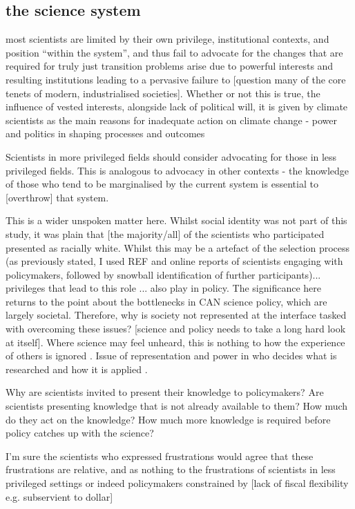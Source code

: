 \subsection{the science system}
\cite{Bendell2024} most scientists are limited by their own privilege, institutional contexts, and position ``within the system'', and thus fail to advocate for the changes that are required for truly just transition  
\cite{StoddardEtAl2021} problems arise due to powerful interests and resulting institutions leading to a pervasive failure to [question many of the core tenets of modern, industrialised societies]. Whether or not this is true, the influence of vested interests, alongside lack of political will, it is given by climate scientists as the main reasons for inadequate action on climate change \cite{Carrington2024} 
\cite{TurnhoutMWKL2020} - power and politics in shaping processes and outcomes

Scientists in more privileged fields should consider advocating for those in less privileged fields. This is analogous to advocacy in other contexts - the knowledge of those who tend to be marginalised by the current system is essential to [overthrow] that system.

This is a wider unspoken matter here. Whilst social identity was not part of this study, it was plain that [the majority/all] of the scientists who participated presented as racially white. Whilst this may be a artefact of the selection process (as previously stated, I used REF and online reports of scientists engaging with policymakers, followed by snowball identification of further participants)... privileges that lead to this role ... also play in policy. The significance here returns to the point about the bottlenecks in CAN science policy, which are largely societal. Therefore, why is society not represented at the interface tasked with overcoming these issues? [science and policy needs to take a long hard look at itself]. Where science may feel unheard, this is nothing to how the experience of others is ignored \cite{IbarraJOBCIMRS2022}. Issue of representation and power in who decides what is researched and how it is applied \cite{McNiePS2017}.

Why are scientists invited to present their knowledge to policymakers? Are scientists presenting knowledge that is not already available to them? How much do they act on the knowledge? How much more knowledge is required before policy catches up with the science?

I'm sure the scientists who expressed frustrations would agree that these frustrations are relative, and as nothing to the frustrations of scientists in less privileged settings or indeed policymakers constrained by [lack of fiscal flexibility e.g. subservient to dollar]

